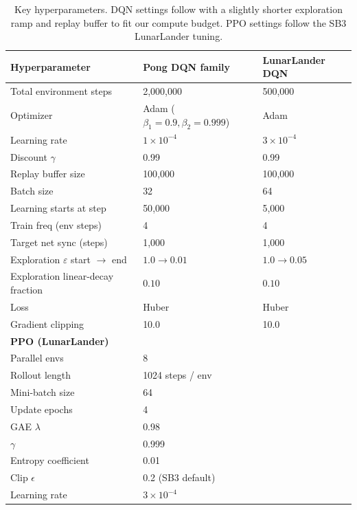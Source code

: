 \begin{table}[h]\centering\small
\caption{Key hyperparameters. DQN settings follow \citet{mnih2015human} with a slightly shorter exploration ramp and replay buffer to fit our compute budget. PPO settings follow the SB3 LunarLander tuning.}
\label{tab:hyperparams}
\begin{tabular}{lll}
\toprule
Hyperparameter & Pong DQN family & LunarLander DQN \\
\midrule
Total environment steps & 2{,}000{,}000 & 500{,}000 \\
Optimizer & Adam ($\beta_1=0.9,\beta_2=0.999$) & Adam \\
Learning rate & $1\!\times\!10^{-4}$ & $3\!\times\!10^{-4}$ \\
Discount $\gamma$ & 0.99 & 0.99 \\
Replay buffer size & 100{,}000 & 100{,}000 \\
Batch size & 32 & 64 \\
Learning starts at step & 50{,}000 & 5{,}000 \\
Train freq (env steps) & 4 & 4 \\
Target net sync (steps) & 1{,}000 & 1{,}000 \\
Exploration $\varepsilon$ start $\to$ end & $1.0\to 0.01$ & $1.0\to 0.05$ \\
Exploration linear-decay fraction & $0.10$ & $0.10$ \\
Loss & Huber & Huber \\
Gradient clipping & 10.0 & 10.0 \\
\midrule
\textbf{PPO (LunarLander)} & \multicolumn{2}{l}{}\\
Parallel envs & \multicolumn{2}{l}{8} \\
Rollout length & \multicolumn{2}{l}{1024 steps / env} \\
Mini-batch size & \multicolumn{2}{l}{64} \\
Update epochs & \multicolumn{2}{l}{4} \\
GAE $\lambda$ & \multicolumn{2}{l}{0.98} \\
$\gamma$ & \multicolumn{2}{l}{0.999} \\
Entropy coefficient & \multicolumn{2}{l}{0.01} \\
Clip $\epsilon$ & \multicolumn{2}{l}{0.2 (SB3 default)} \\
Learning rate & \multicolumn{2}{l}{$3\!\times\!10^{-4}$} \\
\bottomrule
\end{tabular}
\end{table}
